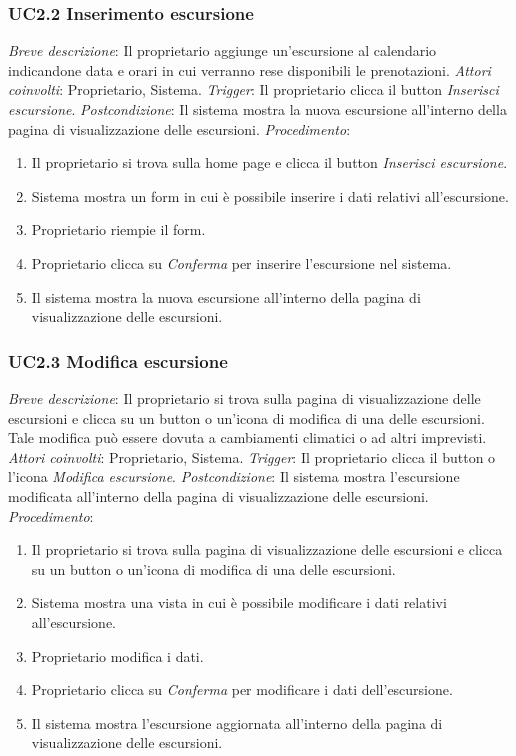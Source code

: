 \subsubsection{UC2.2 Inserimento escursione}

\noindent \emph{Breve descrizione}: Il proprietario aggiunge un'escursione al calendario indicandone data e orari in cui verranno rese disponibili le prenotazioni.\medbreak
\noindent \emph{Attori coinvolti}: Proprietario, Sistema.\medbreak
\noindent \emph{Trigger}: Il proprietario clicca il button \textit{Inserisci escursione}.\medbreak
\noindent \emph{Postcondizione}: Il sistema mostra la nuova escursione all'interno della pagina di visualizzazione delle escursioni.\medbreak
\noindent \emph{Procedimento}:

\begin{enumerate}
    \item Il proprietario si trova sulla home page e clicca il button \textit{Inserisci escursione}.
    \item Sistema mostra un form in cui è possibile inserire i dati relativi all'escursione.
    \item Proprietario riempie il form.
    \item Proprietario clicca su \textit{Conferma} per inserire l'escursione nel sistema.
    \item Il sistema mostra la nuova escursione all'interno della pagina di visualizzazione delle escursioni.
\end{enumerate}

\subsubsection{UC2.3 Modifica escursione}

\noindent \emph{Breve descrizione}: Il proprietario si trova sulla pagina di visualizzazione delle escursioni e clicca su un button o un'icona di modifica di una delle escursioni.
Tale modifica può essere dovuta a cambiamenti climatici o ad altri imprevisti.\medbreak
\noindent \emph{Attori coinvolti}: Proprietario, Sistema.\medbreak
\noindent \emph{Trigger}: Il proprietario clicca il button o l'icona \textit{Modifica escursione}.\medbreak
\noindent \emph{Postcondizione}: Il sistema mostra l'escursione modificata all'interno della pagina di visualizzazione delle escursioni.\medbreak
\noindent \emph{Procedimento}:

\begin{enumerate}
    \item Il proprietario si trova sulla pagina di visualizzazione delle escursioni e clicca su un button o un'icona di modifica di una delle escursioni.
    \item Sistema mostra una vista in cui è possibile modificare i dati relativi all'escursione.
    \item Proprietario modifica i dati.
    \item Proprietario clicca su \textit{Conferma} per modificare i dati dell'escursione.
    \item Il sistema mostra l'escursione aggiornata all'interno della pagina di visualizzazione delle escursioni.
\end{enumerate}

